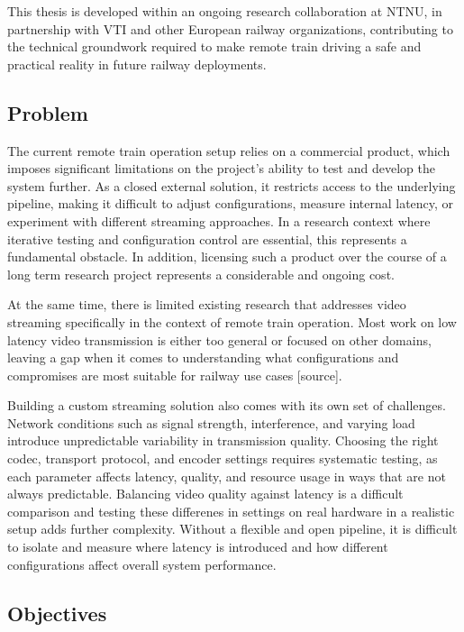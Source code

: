 This thesis is developed within an ongoing research collaboration at NTNU, in partnership with VTI and other European railway organizations, contributing to the technical groundwork required to make remote train driving a safe and practical reality in future railway deployments.

\subsection{Problem}

The current remote train operation setup relies on a commercial product, which imposes significant limitations on the project's ability to test and develop the system further. As a closed external solution, it restricts access to the underlying pipeline, making it difficult to adjust configurations, measure internal latency, or experiment with different streaming approaches. In a research context where iterative testing and configuration control are essential, this represents a fundamental obstacle. In addition, licensing such a product over the course of a long term research project represents a considerable and ongoing cost.

At the same time, there is limited existing research that addresses video streaming specifically in the context of remote train operation. Most work on low latency video transmission is either too general or focused on other domains, leaving a gap when it comes to understanding what configurations and compromises are most suitable for railway use cases [source].

Building a custom streaming solution also comes with its own set of challenges. Network conditions such as signal strength, interference, and varying load introduce unpredictable variability in transmission quality. Choosing the right codec, transport protocol, and encoder settings requires systematic testing, as each parameter affects latency, quality, and resource usage in ways that are not always predictable. Balancing video quality against latency is a difficult comparison and testing these differenes in settings on real hardware in a realistic setup adds further complexity. Without a flexible and open pipeline, it is difficult to isolate and measure where latency is introduced and how different configurations affect overall system performance.

\subsection{Objectives}

